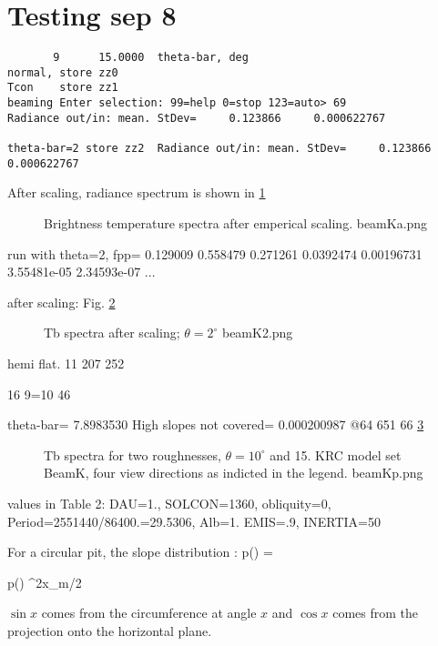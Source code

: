 \documentclass{article}
\begin{document}
\section{Testing sep 8}
\vspace{-3.mm} 
\begin{verbatim}
       9      15.0000  theta-bar, deg
normal, store zz0
Tcon    store zz1
beaming Enter selection: 99=help 0=stop 123=auto> 69
Radiance out/in: mean. StDev=     0.123866     0.000622767

theta-bar=2 store zz2  Radiance out/in: mean. StDev=     0.123866   0.000622767
\end{verbatim} 
After scaling, radiance spectrum is shown in 
\ref{beamKa}
\begin{figure}[!ht] 
\caption[First try]{Brightness temperature spectra after emperical scaling.
\label{beamKa} beamKa.png  }
\end{figure} 


run with theta=2, fpp=  0.129009     0.558479     0.271261    0.0392474   0.00196731  3.55481e-05  2.34593e-07 ...

after scaling: Fig.
\ref{beamK2}
\begin{figure}[!ht] 
\caption[nill slope]{Tb spectra after scaling; $\theta=2^\circ$
\label{beamK2}  beamK2.png  }
\end{figure} 

hemi flat.  11 207 252 


16 9=10 46 

theta-bar=       7.8983530
High slopes not covered=  0.000200987
@64 651 66
\ref{beamKp}
\begin{figure}[!ht] 
\caption[Two slopes]{Tb spectra for two roughnesses, $\theta = 10^\circ$ and 15\qd. KRC model set BeamK, four view directions as indicted in the legend.
\label{beamKp}  beamKp.png  }
\end{figure} 

  values in Table 2: DAU=1., SOLCON=1360, obliquity=0, Period=2551440/86400.=29.5306, Alb=1. EMIS=.9, INERTIA=50

For a circular pit, the slope distribution :
\qbn  p(\theta) =  \qen

\qbn  p(\theta)  {\sin^2x_m/2} \qen

$\sin x$ comes from the circumference at angle $x$ and  $\cos x$ comes from the projection onto the horizontal plane.
\end{document}
